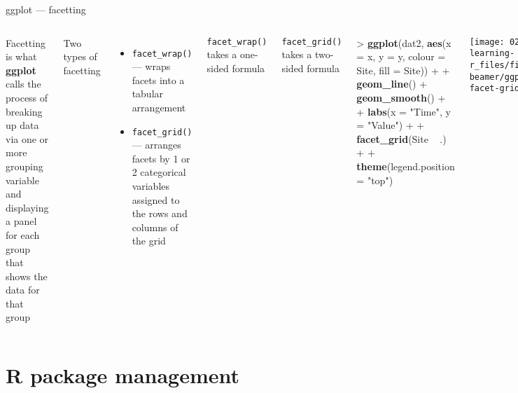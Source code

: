 \documentclass[10pt,ignorenonframetext,compress, aspectratio=169]{beamer}
\newenvironment{Shaded}{\begin{snugshade}}{\end{snugshade}}
\newcommand{\KeywordTok}[1]{\textcolor[rgb]{0.13,0.29,0.53}{\textbf{{#1}}}}
\newcommand{\DataTypeTok}[1]{\textcolor[rgb]{0.13,0.29,0.53}{{#1}}}
\newcommand{\StringTok}[1]{\textcolor[rgb]{0.31,0.60,0.02}{{#1}}}
\newcommand{\NormalTok}[1]{{#1}}
\providecommand{\tightlist}{%
  \setlength{\itemsep}{0pt}\setlength{\parskip}{0pt}}
\newcommand{\columnsbegin}{\begin{columns}}
\newcommand{\columnsend}{\end{columns}}
\begin{document}
\begin{frame}[fragile]{ggplot --- facetting}

\columnsbegin
{}

\alert{Facetting} is what \textbf{ggplot} calls the process of breaking
up data via one or more grouping variable and displaying a panel for
each group that shows the data for that group

Two types of facetting

\begin{itemize}
\tightlist
\item
  \texttt{facet\_wrap()} --- wraps facets into a tabular arrangement
\item
  \texttt{facet\_grid()} --- arranges facets by 1 or 2 categorical
  variables assigned to the rows and columns of the grid
\end{itemize}

\texttt{facet\_wrap()} takes a one-sided formula

\texttt{facet\_grid()} takes a two-sided formula


\begin{Shaded}
\begin{Highlighting}[]
\NormalTok{>}\StringTok{ }\KeywordTok{ggplot}\NormalTok{(dat2, }\KeywordTok{aes}\NormalTok{(}\DataTypeTok{x =} \NormalTok{x, }\DataTypeTok{y =} \NormalTok{y, }\DataTypeTok{colour =} \NormalTok{Site, }\DataTypeTok{fill =} \NormalTok{Site)) +}
\NormalTok{+}\StringTok{     }\KeywordTok{geom_line}\NormalTok{() +}\StringTok{ }\KeywordTok{geom_smooth}\NormalTok{() +}
\NormalTok{+}\StringTok{     }\KeywordTok{labs}\NormalTok{(}\DataTypeTok{x =} \StringTok{"Time"}\NormalTok{, }\DataTypeTok{y =} \StringTok{"Value"}\NormalTok{) +}
\NormalTok{+}\StringTok{     }\KeywordTok{facet_grid}\NormalTok{(Site ~}\StringTok{ }\NormalTok{.) +}
\NormalTok{+}\StringTok{     }\KeywordTok{theme}\NormalTok{(}\DataTypeTok{legend.position =} \StringTok{"top"}\NormalTok{)}
\end{Highlighting}
\end{Shaded}

\begin{center}\texttt{[image: 02-learning-r\_files/figure-beamer/ggplot-facet-grid-1]} \end{center}

\columnsend

\end{frame}

\section{R package management}\label{r-package-management}
\end{document}
